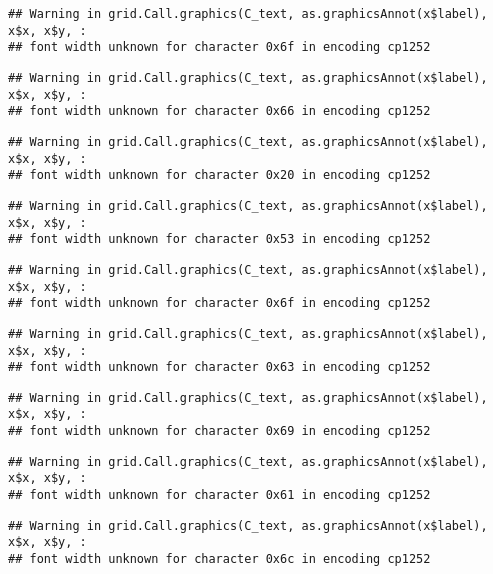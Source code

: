 \documentclass[
]{article}
\begin{document}
\begin{verbatim}
## Warning in grid.Call.graphics(C_text, as.graphicsAnnot(x$label), x$x, x$y, :
## font width unknown for character 0x6f in encoding cp1252
\end{verbatim}

\begin{verbatim}
## Warning in grid.Call.graphics(C_text, as.graphicsAnnot(x$label), x$x, x$y, :
## font width unknown for character 0x66 in encoding cp1252
\end{verbatim}

\begin{verbatim}
## Warning in grid.Call.graphics(C_text, as.graphicsAnnot(x$label), x$x, x$y, :
## font width unknown for character 0x20 in encoding cp1252
\end{verbatim}

\begin{verbatim}
## Warning in grid.Call.graphics(C_text, as.graphicsAnnot(x$label), x$x, x$y, :
## font width unknown for character 0x53 in encoding cp1252
\end{verbatim}

\begin{verbatim}
## Warning in grid.Call.graphics(C_text, as.graphicsAnnot(x$label), x$x, x$y, :
## font width unknown for character 0x6f in encoding cp1252
\end{verbatim}

\begin{verbatim}
## Warning in grid.Call.graphics(C_text, as.graphicsAnnot(x$label), x$x, x$y, :
## font width unknown for character 0x63 in encoding cp1252
\end{verbatim}

\begin{verbatim}
## Warning in grid.Call.graphics(C_text, as.graphicsAnnot(x$label), x$x, x$y, :
## font width unknown for character 0x69 in encoding cp1252
\end{verbatim}

\begin{verbatim}
## Warning in grid.Call.graphics(C_text, as.graphicsAnnot(x$label), x$x, x$y, :
## font width unknown for character 0x61 in encoding cp1252
\end{verbatim}

\begin{verbatim}
## Warning in grid.Call.graphics(C_text, as.graphicsAnnot(x$label), x$x, x$y, :
## font width unknown for character 0x6c in encoding cp1252
\end{verbatim}
\end{document}
